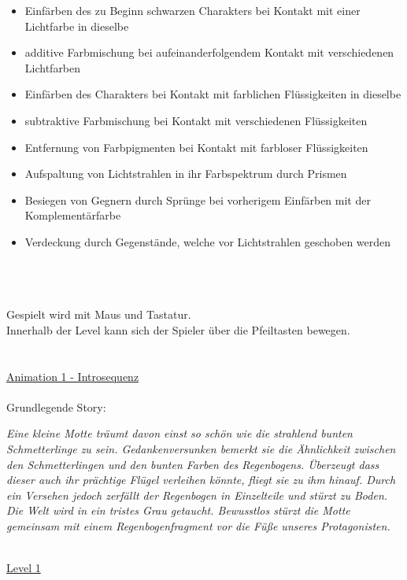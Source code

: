 \documentclass[10pt,a4paper,notitlepage]{report}
\begin{document}
	\begin{itemize}
	\item Einfärben des zu Beginn schwarzen Charakters bei Kontakt mit einer Lichtfarbe in dieselbe\\
	\item additive Farbmischung bei aufeinanderfolgendem Kontakt mit verschiedenen Lichtfarben
	\item Einfärben des Charakters bei Kontakt mit farblichen Flüssigkeiten in dieselbe
	\item subtraktive Farbmischung bei Kontakt mit verschiedenen Flüssigkeiten
	\item Entfernung von Farbpigmenten bei Kontakt mit farbloser Flüssigkeiten
	\item Aufspaltung von Lichtstrahlen in ihr Farbspektrum durch Prismen
	\item Besiegen von Gegnern durch Sprünge bei vorherigem Einfärben mit der Komplementärfarbe
	\item Verdeckung durch Gegenstände, welche vor Lichtstrahlen geschoben werden
	\end{itemize}\
	\\
	\\
	\\
	\Text
		Gespielt wird mit Maus und Tastatur.\\
	Innerhalb der Level kann sich der Spieler über die Pfeiltasten bewegen.
	\clearpage\
	\\
	\
	\\
	\\
	\Text
	\underline{Animation 1 - Introsequenz}\
	\\
	\\
		Grundlegende Story:\\
	\begin{flushright}
	\textit{Eine kleine Motte träumt davon einst so schön wie die strahlend bunten Schmetterlinge zu sein. Gedankenversunken bemerkt sie 
	die Ähnlichkeit zwischen den Schmetterlingen und den bunten Farben des Regenbogens. Überzeugt dass dieser auch ihr prächtige Flügel verleihen könnte, 
	fliegt sie zu ihm hinauf. Durch ein Versehen jedoch zerfällt der Regenbogen in Einzelteile und stürzt zu Boden. \\
	Die Welt wird in ein tristes Grau getaucht. Bewusstlos stürzt die Motte gemeinsam mit einem Regenbogenfragment vor die Füße unseres Protagonisten.}
	\end{flushright}\
	\\
	\underline{Level 1}\\\\\
\end{document}
